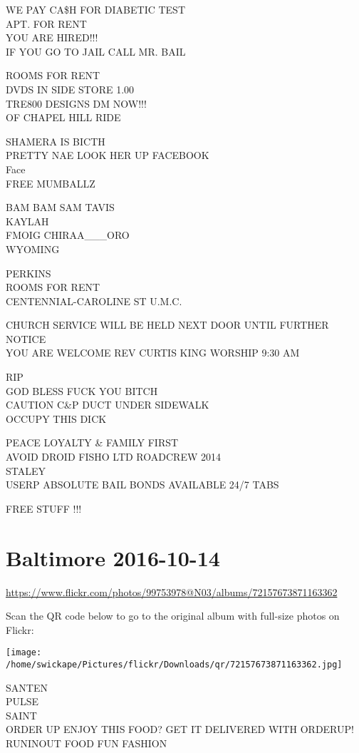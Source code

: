 \documentclass[10pt,letterpaper]{article}
\begin{document}
WE PAY CA\$H FOR DIABETIC TEST\\
APT. FOR RENT\\
YOU ARE HIRED!!!\\
IF YOU GO TO JAIL CALL MR. BAIL

ROOMS FOR RENT\\
DVDS IN SIDE STORE 1.00\\
TRE800 DESIGNS DM NOW!!!\\
OF CHAPEL HILL RIDE

SHAMERA IS BICTH\\
PRETTY NAE LOOK HER UP FACEBOOK\\
Face\\
FREE MUMBALLZ

BAM BAM SAM TAVIS\\
KAYLAH\\
FMOIG CHIRAA\_\_\_ORO\\
WYOMING

PERKINS\\
ROOMS FOR RENT\\
CENTENNIAL{-}CAROLINE ST U.M.C.

CHURCH SERVICE WILL BE HELD NEXT DOOR UNTIL FURTHER NOTICE\\
YOU ARE WELCOME REV CURTIS KING WORSHIP 9:30 AM

RIP\\
GOD BLESS FUCK YOU BITCH\\
CAUTION C\&P DUCT UNDER SIDEWALK\\
OCCUPY THIS DICK

PEACE LOYALTY \& FAMILY FIRST\\
AVOID DROID FISHO LTD ROADCREW 2014\\
STALEY\\
USERP ABSOLUTE BAIL BONDS AVAILABLE 24/7 TABS

FREE STUFF !!!


\section*{Baltimore 2016-10-14}

\url{https://www.flickr.com/photos/99753978@N03/albums/72157673871163362}

Scan the QR code below to go to the original album with full-size photos on Flickr:

\texttt{[image: /home/swickape/Pictures/flickr/Downloads/qr/72157673871163362.jpg]}


SANTEN\\
PULSE\\
SAINT\\
ORDER UP ENJOY THIS FOOD?  GET IT DELIVERED WITH ORDERUP!  RUNINOUT FOOD FUN FASHION
\end{document}
